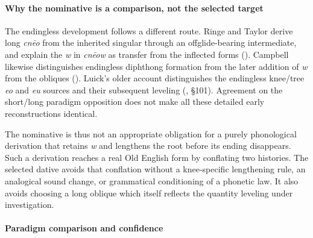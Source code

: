 \documentclass[
  british,
  a4paper,
]{article}
\begin{document}
\paragraph{Why the nominative is a comparison, not the selected
target}\label{why-the-nominative-is-a-comparison-not-the-selected-target}

The endingless development follows a different route. Ringe and Taylor
derive long \emph{cnēo} from the inherited singular through an
offglide-bearing intermediate, and explain the \emph{w} in \emph{cnēow}
as transfer from the inflected forms
().
Campbell likewise distinguishes endingless diphthong formation from the
later addition of \emph{w} from the obliques
(). Luick's
older account distinguishes the endingless knee/tree \emph{eo} and
\emph{eu} sources and their subsequent leveling
(, §101). Agreement on
the short/long paradigm opposition does not make all these detailed
early reconstructions identical.

The nominative is thus not an appropriate obligation for a purely
phonological derivation that retains \emph{w} and lengthens the root
before its ending disappears. Such a derivation reaches a real Old
English form by conflating two histories. The selected dative avoids
that conflation without a knee-specific lengthening rule, an analogical
sound change, or grammatical conditioning of a phonetic law. It also
avoids choosing a long oblique which itself reflects the quantity
leveling under investigation.

\paragraph{Paradigm comparison and
confidence}\label{paradigm-comparison-and-confidence}
\end{document}
